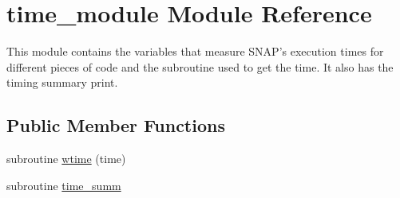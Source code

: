\hypertarget{classtime__module}{\section{time\-\_\-module Module Reference}
\label{classtime__module}
}


This module contains the variables that measure S\-N\-A\-P's execution times for different pieces of code and the subroutine used to get the time. It also has the timing summary print.  


\subsection*{Public Member Functions}
\begin{DoxyCompactItemize}
\item 
subroutine \hyperlink{classtime__module_ad86f74c6ac28ecc6b163c6f777732f28}{wtime} (time)
\item 
subroutine \hyperlink{classtime__module_a43d6d123945fe8057651a3e5875aefce}{time\-\_\-summ}
\end{DoxyCompactItemize}
